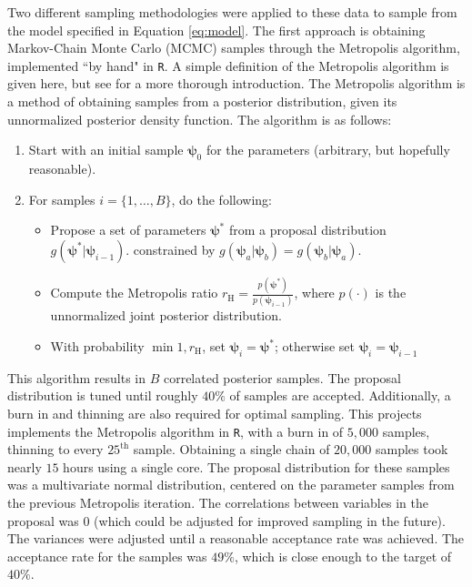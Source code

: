 \documentclass[11pt]{article}
\newcommand{\code}{\texttt}
\begin{document}
Two different sampling methodologies were applied to these data to sample from the model specified in Equation \ref{eq:model}. The first approach is obtaining Markov-Chain Monte Carlo (MCMC) samples through the Metropolis algorithm, implemented ``by hand" in \code{R}. A simple definition of the Metropolis algorithm is given here, but see \cite{bhanot1988metropolis} for a more thorough introduction. The Metropolis algorithm is a method of obtaining samples from a posterior distribution, given its unnormalized posterior density function. The algorithm is as follows:

\begin{enumerate}
    \item Start with an initial sample $\boldsymbol{\psi}_0$ for the parameters (arbitrary, but hopefully reasonable).
    \item For samples $i=\{1,\dots,B\}$, do the following:
    \begin{itemize}
        \item Propose a set of parameters $\boldsymbol{\psi}^*$ from a proposal distribution $g(\boldsymbol{\psi}^*|\boldsymbol{\psi}_{i-1})$. constrained by $g(\boldsymbol{\psi}_a|\boldsymbol{\psi}_b)=g(\boldsymbol{\psi}_b|\boldsymbol{\psi}_a)$.
        \item Compute the Metropolis ratio $r_{\text{H}}=\frac{p(\boldsymbol{\psi}^*)}{p(\boldsymbol{\psi}_{i-1})}$, where $p(\cdot)$ is the unnormalized joint posterior distribution.
        \item With probability $\min{1,r_{\text{H}}}$, set $\boldsymbol{\psi}_i=\boldsymbol{\psi}^*$; otherwise set $\boldsymbol{\psi}_i=\boldsymbol{\psi}_{i-1}$
    \end{itemize}
\end{enumerate}

This algorithm results in $B$ correlated posterior samples. The proposal distribution is tuned until roughly $40\%$ of samples are accepted. Additionally, a burn in and thinning are also required for optimal sampling. This projects implements the Metropolis algorithm in \code{R}, with a burn in of $5{,}000$ samples, thinning to every $25^{\text{th}}$ sample. Obtaining a single chain of $20{,}000$ samples took nearly $15$ hours using a single core. The proposal distribution for these samples was a multivariate normal distribution, centered on the parameter samples from the previous Metropolis iteration. The correlations between variables in the proposal was $0$ (which could be adjusted for improved sampling in the future). The variances were adjusted until a reasonable acceptance rate was achieved. The acceptance rate for the samples was $49\%$, which is close enough to the target of $40\%$. 
\end{document}
